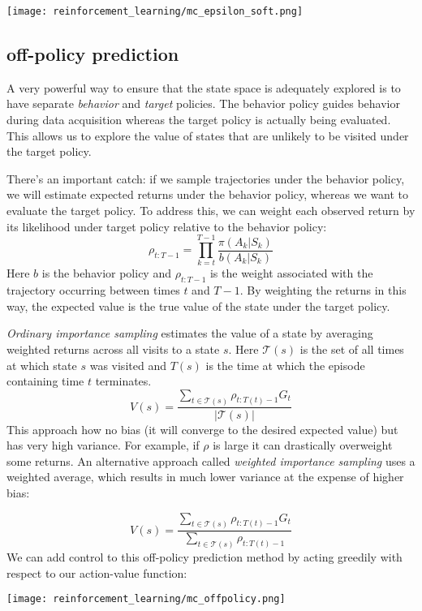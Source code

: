 \begin{center}\texttt{[image: reinforcement\_learning/mc\_epsilon\_soft.png]}\end{center}

\subsection{off-policy prediction}
A very powerful way to ensure that the state space is adequately explored is to have separate \textit{behavior} and \textit{target} policies. The behavior policy guides behavior during data acquisition whereas the target policy is actually being evaluated. This allows us to explore the value of states that are unlikely to be visited under the target policy.

There's an important catch: if we sample trajectories under the behavior policy, we will estimate expected returns under the behavior policy, whereas we want to evaluate the target policy. To address this, we can weight each observed return by its likelihood under target policy relative to the behavior policy:
$$\rho_{t:T-1} = \prod_{k=t}^{T-1}\frac{\pi(A_k|S_k)}{b(A_k|S_k)}$$
Here $b$ is the behavior policy and $\rho_{t:T-1}$ is the weight associated with the trajectory occurring between times $t$ and $T-1$. By weighting the returns in this way, the expected value is the true value of the state under the target policy.

\textit{Ordinary importance sampling} estimates the value of a state by averaging weighted returns across all visits to a state $s$. Here $\mathcal{T}(s)$ is the set of all times at which state $s$ was visited and $T(s)$ is the time at which the episode containing time $t$ terminates.
$$V(s) = \frac{\sum_{t \in \mathcal{T}(s)} \rho_{t:T(t)-1} G_t}    {|\mathcal{T}(s)|}$$
This approach how no bias (it will converge to the desired expected value) but has very high variance. For example, if $\rho$ is large it can drastically overweight some returns. An alternative approach called \textit{weighted importance sampling} uses a weighted average, which results in much lower variance at the expense of higher bias:

$$V(s) = \frac{\sum_{t \in \mathcal{T}(s)} \rho_{t:T(t)-1} G_t}    {\sum_{t \in \mathcal{T}(s)} \rho_{t:T(t)-1}}$$
We can add control to this off-policy prediction method by acting greedily with respect to our action-value function:

\begin{center}\texttt{[image: reinforcement\_learning/mc\_offpolicy.png]}\end{center}


